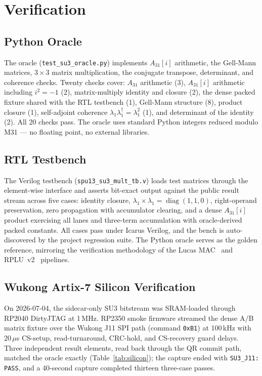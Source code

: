 \documentclass[conference]{IEEEtran}
\begin{document}
\section{Verification}

\subsection{Python Oracle}

The oracle (\texttt{test\_su3\_oracle.py}) implements $A_{31}[i]$
arithmetic, the Gell-Mann matrices, $3\times3$ matrix multiplication, the
conjugate transpose, determinant, and coherence checks. Twenty checks
cover: $A_{31}$ arithmetic (3), $A_{31}[i]$ arithmetic including
$i^2 = -1$ (2), matrix-multiply identity and closure (2), the dense packed
fixture shared with the RTL testbench (1), Gell-Mann structure (8), product
closure (1), self-adjoint coherence
$\lambda_1\lambda_1^\dagger = \lambda_1^2$ (1), and determinant of the
identity (2). All 20 checks pass. The oracle uses standard Python integers
reduced modulo M31 --- no floating point, no external libraries.

\subsection{RTL Testbench}

The Verilog testbench (\texttt{spu13\_su3\_mult\_tb.v}) loads test
matrices through the element-wise interface and asserts bit-exact output
against the public result stream across five cases: identity closure,
$\lambda_1 \times \lambda_1 = \operatorname{diag}(1,1,0)$, right-operand
preservation, zero propagation with accumulator clearing, and a dense
$A_{31}[i]$ product exercising all lanes and three-term accumulation with
oracle-derived packed constants. All cases pass under Icarus Verilog, and
the bench is auto-discovered by the project regression suite. The Python
oracle serves as the golden reference, mirroring the verification
methodology of the Lucas MAC~\cite{lucas2026} and RPLU~v2~\cite{rplu2026}
pipelines.

\subsection{Wukong Artix-7 Silicon Verification}

On 2026-07-04, the sidecar-only SU3 bitstream was SRAM-loaded through
RP2040 DirtyJTAG at 1\,MHz. RP2350 smoke firmware streamed the dense A/B
matrix fixture over the Wukong J11 SPI path (command \texttt{0xB1}) at
100\,kHz with 20\,$\mu$s CS-setup, read-turnaround, CRC-hold, and
CS-recovery guard delays. Three independent result elements, read back
through the QR commit path, matched the oracle exactly
(Table~\ref{tab:silicon}); the capture ended with \texttt{SU3\_J11: PASS},
and a 40-second capture completed thirteen three-case passes.
\end{document}
